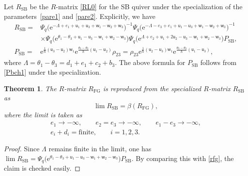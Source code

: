 \documentclass[pdftex]{sigma}
\newcommand{\e}{{\mathrm e}}
\newcommand{\uu}{{\mathsf u}}
\newcommand{\ww}{{\mathsf w}}
\numberwithin{equation}{section}
\newtheorem{Theorem}{Theorem}[section]
\begin{document}
Let $R_\mathrm{SB}$ be the $R$-matrix \eqref{RL0} for the SB quiver under the specialization of the
parameters~\eqref{pare1} and \eqref{pare2}.
Explicitly, we have
\begin{align*}
R_\mathrm{SB} ={}& \Psi_q\bigl(\e^{-\Lambda+e_1+\uu_1+\uu_3+\ww_1-\ww_2+\ww_3}\bigr)^{-1}
\Psi_q\bigl(\e^{-\Lambda-e_3+e_1+\uu_1-\uu_3+\ww_1-\ww_2+\ww_3}\bigr)^{-1}
 \\
& \times
\Psi_q\bigl(\e^{\theta_1-\theta_3+\uu_1-\uu_3-\ww_1+\ww_2-\ww_3}\bigr)
\Psi_q\bigl(\e^{\Lambda+e_2+\uu_1+2\uu_2-\uu_3-\ww_1+\ww_2-\ww_3}\bigr)P_\mathrm{SB},
\\
P_\mathrm{SB} ={}&
\e^{\tfrac{1}{\hbar}(\uu_3-\uu_2)\ww_1}\e^{\tfrac{\theta_3-\theta_2}{\hbar}(\uu_1-\uu_2)}\rho_{23}
=
\rho_{23}\e^{\tfrac{1}{\hbar}(\uu_2-\uu_3)\ww_1}\e^{\tfrac{\theta_3-\theta_2}{\hbar}(\uu_1-\uu_3)},
\end{align*}
where $\Lambda =\theta_1-\theta_3= d_1+e_1+c_2+b_3$.
The above formula for $P_\mathrm{SB}$ follows from \eqref{Pbch1} under the specialization.

\begin{Theorem}\label{th:fg}
The $R$-matrix $R_\mathrm{FG}$ is reproduced from the specialized $R$-matrix
$R_\mathrm{SB}$ as
\[
\lim R_\mathrm{SB} = \beta(R_\mathrm{FG}),
\]
where the limit is taken as
\begin{gather}
e_1 \rightarrow -\infty, \qquad
e_2=e_3 \rightarrow -\infty, \qquad
e_1-e_3 \rightarrow -\infty,\nonumber
\\
e_i+d_i= \mathrm{finite}, \qquad i=1,2,3.\label{elim}
\end{gather}
\end{Theorem}
\begin{proof}
Since $\Lambda$ remains finite in the limit,
one has
$\lim R_\mathrm{SB} = \Psi_q\bigl(\e^{\theta_1-\theta_3+\uu_1-\uu_3-\ww_1+\ww_2-\ww_3}\bigr)
P_\mathrm{SB}$.
By comparing this with \eqref{rfg}, the claim is checked easily.
\end{proof}
\end{document}
